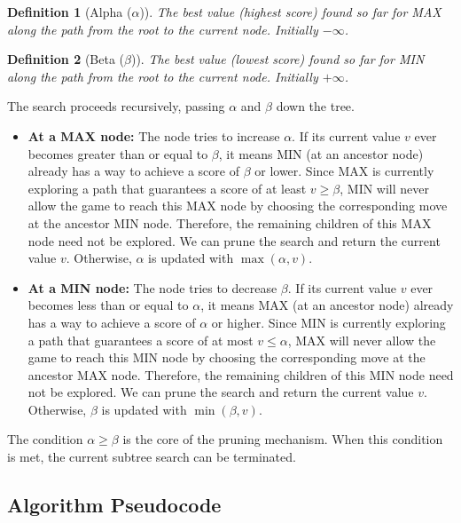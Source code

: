 \documentclass[11pt]{article}
\newtheorem{definition}{Definition}
\begin{document}
\begin{definition}[Alpha ($\alpha$)]
The best value (highest score) found so far for MAX along the path from the root to the current node. Initially $-\infty$.
\end{definition}

\begin{definition}[Beta ($\beta$)]
The best value (lowest score) found so far for MIN along the path from the root to the current node. Initially $+\infty$.
\end{definition}

The search proceeds recursively, passing $\alpha$ and $\beta$ down the tree.

\begin{itemize}
    \item \textbf{At a MAX node:} The node tries to increase $\alpha$. If its current value $v$ ever becomes greater than or equal to $\beta$, it means MIN (at an ancestor node) already has a way to achieve a score of $\beta$ or lower. Since MAX is currently exploring a path that guarantees a score of at least $v \ge \beta$, MIN will never allow the game to reach this MAX node by choosing the corresponding move at the ancestor MIN node. Therefore, the remaining children of this MAX node need not be explored. We can prune the search and return the current value $v$. Otherwise, $\alpha$ is updated with $\max(\alpha, v)$.
    \item \textbf{At a MIN node:} The node tries to decrease $\beta$. If its current value $v$ ever becomes less than or equal to $\alpha$, it means MAX (at an ancestor node) already has a way to achieve a score of $\alpha$ or higher. Since MIN is currently exploring a path that guarantees a score of at most $v \le \alpha$, MAX will never allow the game to reach this MIN node by choosing the corresponding move at the ancestor MAX node. Therefore, the remaining children of this MIN node need not be explored. We can prune the search and return the current value $v$. Otherwise, $\beta$ is updated with $\min(\beta, v)$.
\end{itemize}

The condition $\alpha \ge \beta$ is the core of the pruning mechanism. When this condition is met, the current subtree search can be terminated.

\subsection{Algorithm Pseudocode}
\end{document}
